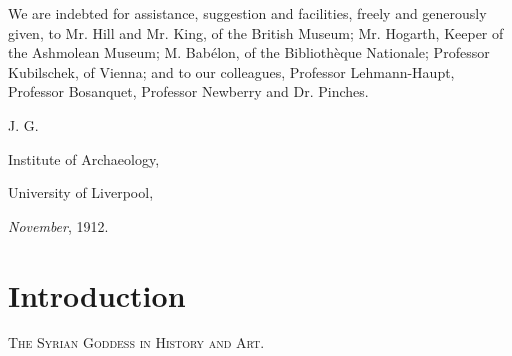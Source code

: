 \documentclass[a4paper, 11pt, oneside, polutonikogreek, english]{article}
\begin{document}
We are indebted for assistance, suggestion and facilities, freely and generously given, to Mr. Hill and Mr. King, of the British Museum; Mr. Hogarth, Keeper of the Ashmolean Museum; M. Babélon, of the Bibliothèque Nationale; Professor Kubilschek, of Vienna; and to our colleagues, Professor Lehmann-Haupt, Professor Bosanquet, Professor Newberry and Dr. Pinches.

J. G.

\hspace*{5mm}Institute of Archaeology,

\hspace*{10mm}University of Liverpool,

\hspace*{15mm}\emph{November}, 1912.
\clearpage
\section{Introduction}
\begin{center}
\scshape{The Syrian Goddess in History and Art.}
\end{center}
\end{document}
